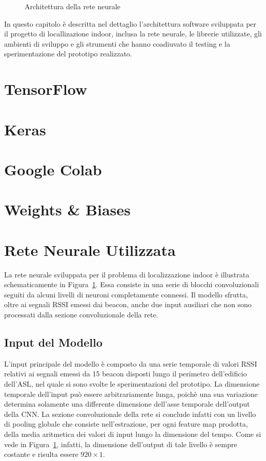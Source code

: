 
\begin{figure}[H]
  \caption{Architettura della rete neurale}%
  \label{fig:crynet}%
\end{figure}
In questo capitolo è descritta nel dettaglio l'architettura software sviluppata
per il progetto di locallizazione indoor, inclusa la rete neurale, le librerie
utilizzate, gli ambienti di sviluppo e gli strumenti che hanno coadiuvato il
testing e la sperimentazione del prototipo realizzato.
\section{TensorFlow}
\section{Keras}
\section{Google Colab}
\section{Weights \& Biases}
\section{Rete Neurale Utilizzata}
La rete neurale sviluppata per il problema di localizzazione indoor è
illustrata schematicamente in Figura~\ref{fig:crynet}. Essa consiste in una
serie di blocchi convoluzionali seguiti da alcuni livelli di neuroni
completamente connessi. Il modello sfrutta, oltre ai segnali RSSI emessi dai
beacon, anche due input ausiliari che non sono processati dalla sezione
convoluzionale della rete.
\subsection{Input del Modello}
L'input principale del modello è composto da una serie temporale di valori RSSI
relativi ai segnali emessi da 15 beacon disposti lungo il perimetro
dell'edificio dell'ASL, nel quale si sono svolte le sperimentazioni del
prototipo. La dimensione temporale dell'input può essere arbitrariamente lunga,
poichè una sua variazione determina solamente una differente dimensione
dell'asse temporale dell'output della CNN\@. La sezione convoluzionale della
rete si conclude infatti con un livello di pooling globale che consiste
nell'estrazione, per ogni feature map prodotta, della media aritmetica dei valori di
input lungo la dimensione del tempo. Come si vede in Figura~\ref{fig:crynet},
infatti, la dimensione dell'output di tale livello è sempre costante e risulta
essere $920\times1$.


